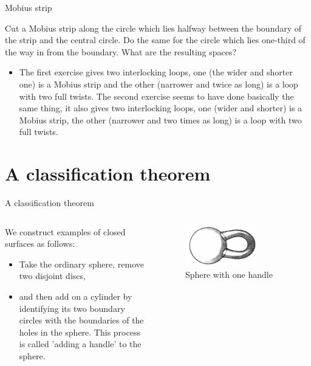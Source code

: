 \documentclass{beamer}
\begin{document}
\begin{frame}{Mobius strip}
  \begin{block}{}
    Cut a Mobius strip along the circle which lies halfway between the boundary of the strip and the central circle. Do the same for the circle which lies one-third of the way in from the boundary. What are the resulting spaces?
    \begin{itemize}
    \item The first exercise gives two interlocking loops, one (the wider and shorter one) is a Mobius strip and the other (narrower and twice as long) is a loop with two full twists. The second exercise seems to have done basically the same thing, it also gives two interlocking loops, one (wider and shorter) is a Mobius strip, the other (narrower and two times as long) is a loop with two full twists.
    \end{itemize}
  \end{block}
\end{frame}

\section{A classification theorem}

\begin{frame}{A classification theorem}
  \begin{columns}
    \begin{column}{0.6\textwidth}
      \begin{block}{}
        We construct examples of closed surfaces as follows:
        \begin{itemize}
        \item Take the ordinary sphere, remove two disjoint discs,
        \item and then add on a cylinder by identifying its two boundary circles with the boundaries of the holes in the sphere.
          This process is called 'adding a handle' to the sphere.
        \end{itemize}
      \end{block}
    \end{column}
    \begin{column}{0.4\textwidth}
      \begin{figure}
        \centering
        \includegraphics[width=0.7\textwidth]{figure_1_17.png}
        \caption{Sphere with one handle}
      \end{figure}
    \end{column}
  \end{columns}
\end{frame}
\end{document}
